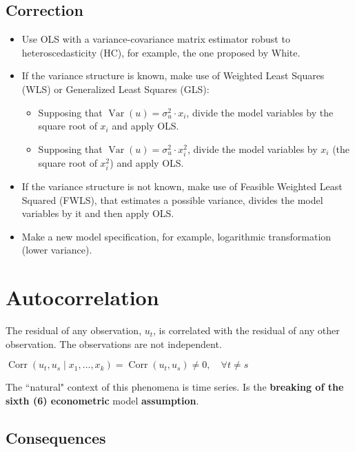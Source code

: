 \documentclass[10pt, a4paper, landscape]{article}
\DeclareMathOperator{\Var}{Var}
\DeclareMathOperator{\Corr}{Corr}
\begin{document}
\begin{multicols}{3}
\subsection*{Correction}

\begin{itemize}[leftmargin=*]
	\item Use OLS with a variance-covariance matrix estimator robust to heteroscedasticity (HC), for example, the one proposed by White.
	\item If the variance structure is known, make use of Weighted Least Squares (WLS) or Generalized Least Squares (GLS):
	\begin{itemize}[leftmargin=*]
		\item Supposing that \( \Var(u) = \sigma_{u}^{2} \cdot x_{i} \), divide the model variables by the square root of \( x_{i} \) and apply OLS.
		\item Supposing that \( \Var(u) = \sigma_{u}^{2} \cdot x_{i}^{2} \), divide the model variables by \( x_{i} \) (the square root of \( x_{i}^{2} \)) and apply OLS.
	\end{itemize}
	\item If the variance structure is not known, make use of Feasible Weighted Least Squared (FWLS), that estimates a possible variance, divides the model variables by it and then apply OLS.
	\item Make a new model specification, for example, logarithmic transformation (lower variance).
\end{itemize}

\columnbreak

\section*{Autocorrelation}

The residual of any observation, \( u_{t} \), is correlated with the residual of any other observation. The observations are not independent.

\begin{center}
	\( \Corr(u_{t}, u_{s} \mid x_{1}, \ldots, x_{k}) = \Corr(u_{t}, u_{s}) \neq 0, \quad \forall t \neq s \)
\end{center}

The ``natural" context of this phenomena is time series. Is the \textbf{breaking of the sixth (6) econometric} model \textbf{assumption}.

\subsection*{Consequences}


\end{multicols}
\end{document}
